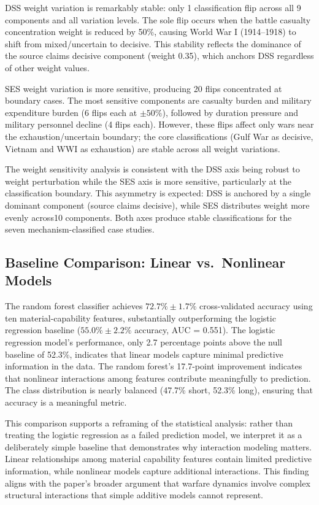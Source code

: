 DSS weight variation is remarkably stable: only 1 classification flip across all 9 components and all variation levels. The sole flip occurs when the battle casualty concentration weight is reduced by 50\%, causing World War I (1914--1918) to shift from mixed/uncertain to decisive. This stability reflects the dominance of the source claims decisive component (weight 0.35), which anchors DSS regardless of other weight values.

SES weight variation is more sensitive, producing 20 flips concentrated at boundary cases. The most sensitive components are casualty burden and military expenditure burden (6 flips each at $\pm 50\%$), followed by duration pressure and military personnel decline (4 flips each). However, these flips affect only wars near the exhaustion/uncertain boundary; the core classifications (Gulf War as decisive, Vietnam and WWI as exhaustion) are stable across all weight variations.

The weight sensitivity analysis is consistent with the DSS axis being robust to weight perturbation while the SES axis is more sensitive, particularly at the classification boundary. This asymmetry is expected: DSS is anchored by a single dominant component (source claims decisive), while SES distributes weight more evenly across10 components. Both axes produce stable classifications for the seven mechanism-classified case studies.

\subsection{Baseline Comparison: Linear vs.\ Nonlinear Models}

The random forest classifier achieves $72.7\% \pm 1.7\%$ cross-validated accuracy using ten material-capability features, substantially outperforming the logistic regression baseline ($55.0\% \pm 2.2\%$ accuracy, AUC = 0.551). The logistic regression model's performance, only 2.7 percentage points above the null baseline of 52.3\%, indicates that linear models capture minimal predictive information in the data. The random forest's 17.7-point improvement indicates that nonlinear interactions among features contribute meaningfully to prediction. The class distribution is nearly balanced (47.7\% short, 52.3\% long), ensuring that accuracy is a meaningful metric.

This comparison supports a reframing of the statistical analysis: rather than treating the logistic regression as a failed prediction model, we interpret it as a deliberately simple baseline that demonstrates why interaction modeling matters. Linear relationships among material capability features contain limited predictive information, while nonlinear models capture additional interactions. This finding aligns with the paper's broader argument that warfare dynamics involve complex structural interactions that simple additive models cannot represent.


